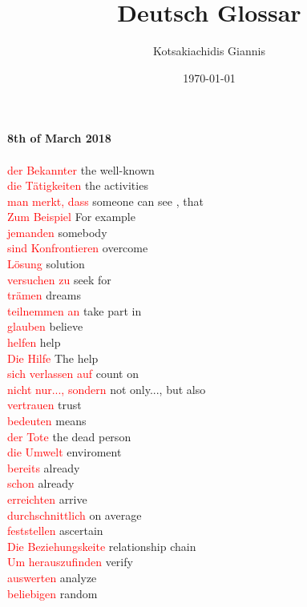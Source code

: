 \documentclass{article}
\title{Deutsch Glossar}
\author{Kotsakiachidis Giannis }
\date{\today }
\begin{document}
	\maketitle
	
	\textbf{8th of March 2018}\\\\
	\textcolor{red}{der Bekannter} the well-known\\
	\textcolor{red}{die Tätigkeiten} the activities\\
	\textcolor{red}{man merkt, dass} someone can see , that\\
	\textcolor{red}{Zum Beispiel} For example\\
	\textcolor{red}{jemanden} somebody\\
	\textcolor{red}{sind Konfrontieren} overcome\\
	\textcolor{red}{Lösung} solution\\
	\textcolor{red}{versuchen zu} seek for\\
	\textcolor{red}{trämen} dreams\\
	\textcolor{red}{teilnemmen an} take part in\\
	\textcolor{red}{glauben} believe\\
	\textcolor{red}{helfen} help\\
	\textcolor{red}{Die Hilfe} The help\\
	\textcolor{red}{sich verlassen auf} count on\\
	\textcolor{red}{nicht nur..., sondern} not only..., but also\\
	\textcolor{red}{vertrauen} trust\\
	\textcolor{red}{bedeuten} means\\
	\textcolor{red}{der Tote} the dead person\\
	\textcolor{red}{die Umwelt} enviroment\\
	\textcolor{red}{bereits} already\\
	\textcolor{red}{schon} already\\
	\textcolor{red}{erreichten} arrive\\
	\textcolor{red}{durchschnittlich} on average\\
	\textcolor{red}{feststellen} ascertain\\
	\textcolor{red}{Die Beziehungskeite} relationship chain\\
	\textcolor{red}{Um herauszufinden} verify\\
	\textcolor{red}{auswerten} analyze \\
	\textcolor{red}{beliebigen} random\\
\end{document}
